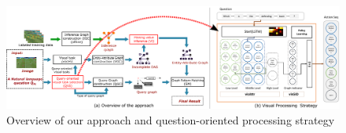 \documentclass[10pt,twocolumn,letterpaper]{article}
\begin{document}

\begin{figure}[tb!] %
\vspace{-1ex}
\centerline{\includegraphics[scale=0.25]{overview.eps}}
\caption{Overview of our approach and question-oriented processing strategy} \label{fig-overview}
\vspace{-2ex}
\end{figure}








{\small


}
\end{document}
